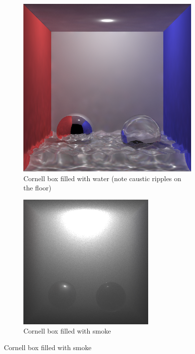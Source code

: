 \begin{figure}
\ContinuedFloat
\centering
	\begin{subfigure}[b]{0.6\textwidth}
	\includegraphics[width=\textwidth]{./images/renders/water.png}
	\caption{Cornell box filled with water (note caustic ripples on the floor)}
	\end{subfigure}

	\begin{subfigure}[b]{0.6\textwidth}
	\includegraphics[width=\textwidth]{./images/pmedia.png}
	\caption{Cornell box filled with smoke}
	\end{subfigure}
\end{figure}

